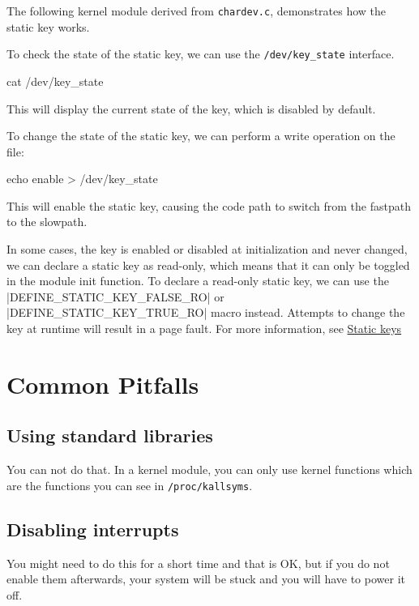 \documentclass[10pt, oneside]{book}
\begin{document}
The following kernel module derived from \verb|chardev.c|, demonstrates how the static key works.


To check the state of the static key, we can use the \verb|/dev/key_state| interface.

\begin{codebash}
cat /dev/key_state
\end{codebash}

This will display the current state of the key, which is disabled by default.

To change the state of the static key, we can perform a write operation on the file:

\begin{codebash}
echo enable > /dev/key_state
\end{codebash}

This will enable the static key, causing the code path to switch from the fastpath to the slowpath.

In some cases, the key is enabled or disabled at initialization and never changed, we can declare a static key as read-only, which means that it can only be toggled in the module init function. To declare a read-only static key, we can use the \cpp|DEFINE_STATIC_KEY_FALSE_RO| or \cpp|DEFINE_STATIC_KEY_TRUE_RO| macro instead. Attempts to change the key at runtime will result in a page fault.
For more information, see \href{https://www.kernel.org/doc/Documentation/static-keys.txt}{Static keys}

\section{Common Pitfalls}
\label{sec:pitfall}

\subsection{Using standard libraries}
\label{sec:using_stdlib}
You can not do that.
In a kernel module, you can only use kernel functions which are the functions you can see in \verb|/proc/kallsyms|.

\subsection{Disabling interrupts}
\label{sec:disabling_interrupts}
You might need to do this for a short time and that is OK, but if you do not enable them afterwards, your system will be stuck and you will have to power it off.
\end{document}
